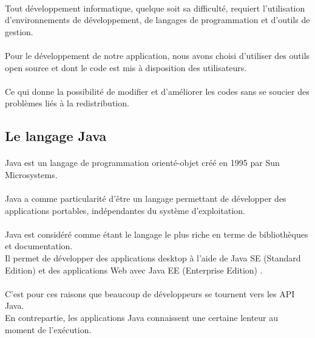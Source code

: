 \documentclass[12pt, a4paper, oneside]{book}
\begin{document}
\paragraph{}
Tout développement informatique, quelque soit sa difficulté, requiert l'utilisation d'environnements de développement, de langages de programmation et d'outils de gestion.
\paragraph{}
Pour le développement de notre application, nous avons choisi d'utiliser des outils open source et dont le code est mis à disposition des utilisateurs.
\paragraph{}
Ce qui donne la possibilité de modifier et d'améliorer les codes sans se soucier des problèmes liés à la redistribution.

\subsection{Le langage Java}
\paragraph{}
Java est un langage de programmation orienté-objet créé en 1995 par Sun Microsystems.
\paragraph{}
Java a comme particularité d'être un langage permettant de développer des applications portables, indépendantes du système d'exploitation. 
\paragraph{}
Java est considéré comme étant le langage le plus riche en terme de bibliothèques et documentation.\\
Il permet de développer des applications desktop à l'aide de Java SE (Standard Edition) et des applications Web avec Java EE (Enterprise Edition) \citep{java}.
\paragraph{}
C'est pour ces raisons que beaucoup de développeurs se tournent vers les API Java.\\
En contrepartie, les applications Java connaissent une certaine lenteur au moment de l'exécution.
\end{document}

